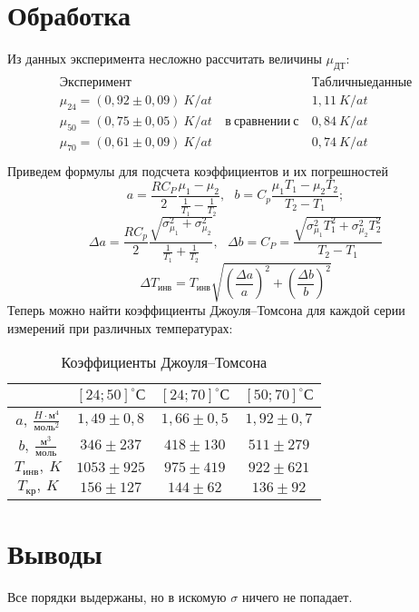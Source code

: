 \documentclass[a4paper,12pt]{article} %
\begin{document}
\section{Обработка}
Из данных эксперимента несложно рассчитать величины $ \mu_{ДТ} $:
\begin{align}
	\begin{array}{ccc}
		Эксперимент && Табличные данные\\
		\mu_{24}=(0,92\pm0,09)~{K}/{at} && 1,11~K/at\\ 
		\mu_{50}=(0,75\pm0,05)~{K}/{at} &~в~сравнении~с~ & 0,84~K/at\\ 
		\mu_{70}=(0,61\pm0,09)~{K}/{at} && 0,74~K/at\\ 
	\end{array}
\end{align}
Приведем формулы для подсчета коэффициентов и их погрешностей
\[
	a=\dfrac{RC_P}{2}\dfrac{\mu_1-\mu_2}{\frac{1}{T_1}-\frac{1}{T_2}},
	~~~
	b=C_p\dfrac{\mu_1T_1-\mu_2T_2}{T_2-T_1};
\]
\[
	\Delta a=\dfrac{RC_p}{2}
	\dfrac{\sqrt{\sigma_{\mu_1}^2+\sigma_{\mu_2}^2}}
	{\frac{1}{T_1}+\frac{1}{T_2}},
	~~~
	\Delta b=C_P=\dfrac{
		\sqrt{\sigma_{\mu_1}^2T_1^2+\sigma_{\mu_2}^2T_2^2}}{T_2-T_1}
\]
\[
	\Delta T_{инв}=T_{инв}
	\sqrt{\left(\dfrac{\Delta a}{a}\right)^2+
		\left(\dfrac{\Delta b}{b}\right)^2}
\]
Теперь можно найти коэффициенты Джоуля–Томсона для каждой серии измерений при различных температурах:
\begin{table}[h]	\centering
	\begin{tabular}{c|ccc}
		\toprule
		& $ [24;50]^\circ С $ 
		& $ [24;70]^\circ С $ 
		& $ [50;70]^\circ С $ \\
		\midrule
		$ a,~\frac{H\cdot м^4}{моль^2} $       
		& $ 1,49\pm0,8 $ & $ 1,66\pm0,5 $ & $ 1,92\pm0,7 $ \\[4pt]
		$ b,~\frac{м^3}{моль} $       
		& $ 346\pm237 $ & $ 418\pm130 $  & $ 511\pm279 $ \\[4pt]
		$ T_{инв},~K $       
		& $ 1053\pm925 $ & $ 975\pm419 $ & $ 922\pm621 $\\
		$ T_{кр},~K $       
		& $ 156\pm127 $ & $ 144\pm62 $ & $ 136\pm92 $\\
		\bottomrule
	\end{tabular}
	\caption{Коэффициенты Джоуля–Томсона}
	\label{my-label}
\end{table}
\section{Выводы}
Все порядки выдержаны, но в искомую $ \sigma $ ничего не попадает.
\end{document}
